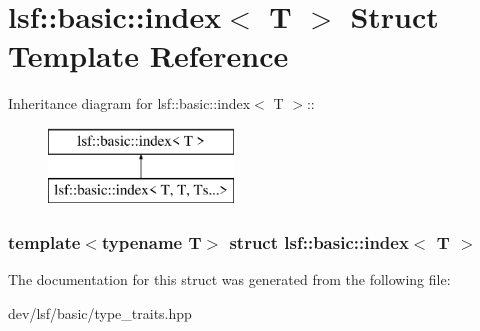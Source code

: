 \hypertarget{structlsf_1_1basic_1_1index_3_01T_01_4}{
\section{lsf::basic::index$<$ T $>$ Struct Template Reference}
\label{structlsf_1_1basic_1_1index_3_01T_01_4}
}
Inheritance diagram for lsf::basic::index$<$ T $>$::\begin{figure}[H]
\begin{center}
\leavevmode
\includegraphics[height=2cm]{structlsf_1_1basic_1_1index_3_01T_01_4}
\end{center}
\end{figure}
\subsubsection*{template$<$typename T$>$ struct lsf::basic::index$<$ T $>$}



The documentation for this struct was generated from the following file:\begin{DoxyCompactItemize}
\item 
dev/lsf/basic/type\_\-traits.hpp\end{DoxyCompactItemize}
